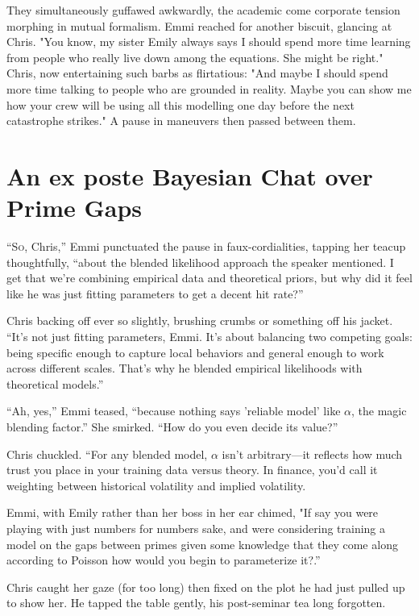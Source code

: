 \smallskip

They simultaneously guffawed awkwardly, the academic come corporate tension morphing in mutual formalism. Emmi reached for another biscuit, glancing at Chris. "You know, my sister Emily always says I should spend more time learning from people who really live down among the equations. She might be right." Chris, now entertaining such barbs as flirtatious: "And maybe I should spend more time talking to people who are grounded in reality. Maybe you can show me how your crew will be using all this modelling one day before the next catastrophe strikes." A pause in maneuvers then passed between them.


\section*{An ex poste Bayesian Chat over Prime Gaps}

\lettrine{“S}o, Chris,” Emmi punctuated the pause in faux-cordialities, tapping her teacup thoughtfully, “about the blended likelihood approach the speaker mentioned. I get that we’re combining empirical data and theoretical priors, but why did it feel like he was just fitting parameters to get a decent hit rate?”

Chris backing off ever so slightly, brushing crumbs or something off his jacket. “It’s not just fitting parameters, Emmi. It’s about balancing two competing goals: being specific enough to capture local behaviors and general enough to work across different scales. That’s why he blended empirical likelihoods with theoretical models.”

“Ah, yes,” Emmi teased, “because nothing says 'reliable model' like \(\alpha\), the magic blending factor.” She smirked. “How do you even decide its value?”

Chris chuckled. “For any blended model, \(\alpha\) isn’t arbitrary—it reflects how much trust you place in your training data versus theory. In finance, you’d call it weighting between historical volatility and implied volatility. 

Emmi, with Emily rather than her boss in her ear chimed, "If say you were playing with just numbers for numbers sake, and were considering training a model on the gaps between primes given some knowledge that they come along according to Poisson how would you begin to parameterize it?.”

Chris caught her gaze (for too long) then fixed on the plot he had just pulled up to show her. He tapped the table gently, his post-seminar tea long forgotten. 

